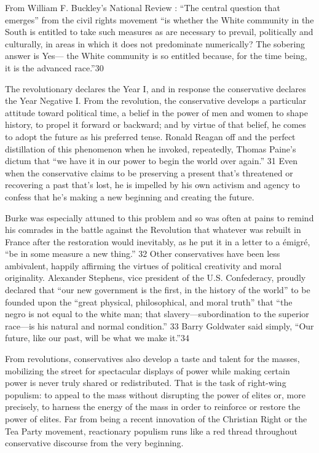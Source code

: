  \par 
From William F. Buckley’s National Review : “The central question that emerges” from the civil rights movement “is whether the White community in the South is entitled to take such measures as are necessary to prevail, politically and culturally, in areas in which it does not predominate numerically? The sobering answer is Yes— the White community is so entitled because, for the time being, it is the advanced race.”{\color{blue}30}
 \par 
The revolutionary declares the Year I, and in response the conservative declares the Year Negative I. From the revolution, the conservative develops a particular attitude toward political time, a belief in the power of men and women to shape history, to propel it forward or backward; and by virtue of that belief, he comes to adopt the future as his preferred tense. Ronald Reagan off and the perfect distillation of this phenomenon when he invoked, repeatedly, Thomas Paine’s dictum that “we have it in our power to begin the world over again.” {\color{blue}31} Even when the conservative claims to be preserving a present that’s threatened or recovering a past that’s lost, he is impelled by his own activism and agency to confess that he’s making a new beginning and creating the future.
 \par 
Burke was especially attuned to this problem and so was often at pains to remind his comrades in the battle against the Revolution that whatever was rebuilt in France after the restoration would inevitably, as he put it in a letter to a émigré, “be in some measure a new thing.” {\color{blue}32} Other conservatives have been less ambivalent, happily affirming the virtues of political creativity and moral originality. Alexander Stephens, vice president of the U.S. Confederacy, proudly declared that “our new government is the first, in the history of the world” to be founded upon the “great physical, philosophical, and moral truth” that “the negro is not equal to the white man; that slavery—subordination to the superior race—is his natural and normal condition.” {\color{blue}33} Barry Goldwater said simply, “Our future, like our past, will be what we make it.”{\color{blue}34}
 \par 
From revolutions, conservatives also develop a taste and talent for the masses, mobilizing the street for spectacular displays of power while making certain power is never truly shared or redistributed. That is the task of right-wing populism: to appeal to the mass without disrupting the power of elites or, more precisely, to harness the energy of the mass in order to reinforce or restore the power of elites. Far from being a recent innovation of the Christian Right or the Tea Party movement, reactionary populism runs like a red thread throughout conservative discourse from the very beginning.
